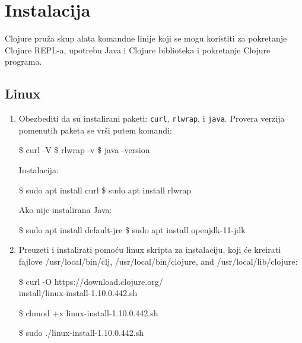 \section{Instalacija}
\label{sec:instalacija}
Clojure pruža skup alata komandne linije koji se mogu koristiti za pokretanje Clojure REPL-a, upotrebu Java i Clojure biblioteka i pokretanje Clojure programa.
\subsection{Linux}
\label{subsec:linux}
\begin{enumerate}
            \item Obezbediti da su instalirani paketi: \texttt{curl}, \texttt{rlwrap}, i \texttt{java}.
            Provera verzija pomenutih paketa se vrši putem komandi:
            \begin{tcolorbox}[colback=green!5!white,colframe=green!5!white,fontupper=\ttfamily]
            \$ curl -V \newline
            \$ rlwrap -v \newline
            \$ java -version
            \end{tcolorbox}
            Instalacija:
            \begin{tcolorbox}[colback=green!5!white,colframe=green!5!white,fontupper=\ttfamily]
            \$ sudo apt install curl \newline
            \$ sudo apt install rlwrap
            \end{tcolorbox}
            Ako nije instalirana Java:
            \begin{tcolorbox}[colback=green!5!white,colframe=green!5!white,fontupper=\ttfamily]
            \$ sudo apt install default-jre \newline
            \$ sudo apt install openjdk-11-jdk
            \end{tcolorbox}
            \item Preuzeti i instalirati pomoću linux skripta za instalaciju, koji će kreirati fajlove /usr/local/bin/clj, /usr/local/bin/clojure, and /usr/local/lib/clojure:
\begin{tcolorbox}[colback=green!5!white,colframe=green!5!white,fontupper=\ttfamily]

\$ curl -O https://download.clojure.org/\\install/linux-install-1.10.0.442.sh

\$ chmod +x linux-install-1.10.0.442.sh

\$ sudo ./linux-install-1.10.0.442.sh
\end{tcolorbox}

\end{enumerate}

